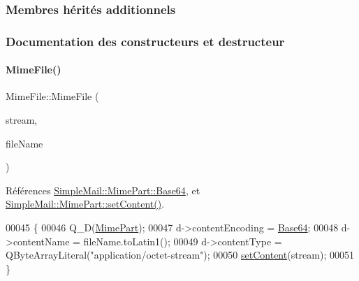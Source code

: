 \subsubsection*{Membres hérités additionnels}


\subsubsection{Documentation des constructeurs et destructeur}
\mbox{\label{class_simple_mail_1_1_mime_file_a813f54f8423832b33fac1a85820bdb4a}} 
\paragraph{\texorpdfstring{Mime\+File()}{MimeFile()}\hspace{0.1cm}{\footnotesize\ttfamily [1/2]}}
{\footnotesize\ttfamily Mime\+File\+::\+Mime\+File (\begin{DoxyParamCaption}\item[{const Q\+Byte\+Array \&}]{stream,  }\item[{const Q\+String \&}]{file\+Name }\end{DoxyParamCaption})}



Références \hyperlink{class_simple_mail_1_1_mime_part_ae67a2f5406958b95b18bf31a7bbeb5c9ae644dc14ba856889814d2da9c995b91a}{Simple\+Mail\+::\+Mime\+Part\+::\+Base64}, et \hyperlink{class_simple_mail_1_1_mime_part_a16791412c7235c04bf16a57120a45b84}{Simple\+Mail\+::\+Mime\+Part\+::set\+Content()}.


\begin{DoxyCode}
00045 \{
00046     Q\_D(\hyperlink{class_simple_mail_1_1_mime_part}{MimePart});
00047     d->contentEncoding = \hyperlink{class_simple_mail_1_1_mime_part_ae67a2f5406958b95b18bf31a7bbeb5c9ae644dc14ba856889814d2da9c995b91a}{Base64};
00048     d->contentName = fileName.toLatin1();
00049     d->contentType = QByteArrayLiteral(\textcolor{stringliteral}{"application/octet-stream"});
00050     \hyperlink{class_simple_mail_1_1_mime_part_a16791412c7235c04bf16a57120a45b84}{setContent}(stream);
00051 \}
\end{DoxyCode}
\mbox{\label{class_simple_mail_1_1_mime_file_a4bf2724afb5a33a7dcdd8a4c9b250c7c}} 

